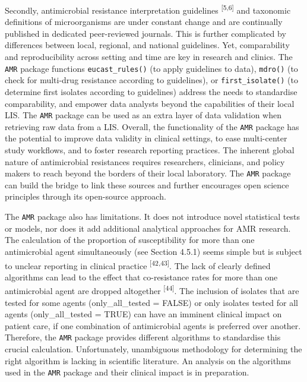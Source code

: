 \documentclass[
]{book}
\begin{document}
Secondly, antimicrobial resistance interpretation guidelines \textsuperscript{{[}5,6{]}} and taxonomic definitions of microorganisms are under constant change and are continually published in dedicated peer-reviewed journals. This is further complicated by differences between local, regional, and national guidelines. Yet, comparability and reproducibility across setting and time are key in research and clinics. The \texttt{AMR} package functions \texttt{eucast\_rules()} (to apply guidelines to data), \texttt{mdro()} (to check for multi-drug resistance according to guidelines), or \texttt{first\_isolate()} (to determine first isolates according to guidelines) address the needs to standardise comparability, and empower data analysts beyond the capabilities of their local LIS. The \texttt{AMR} package can be used as an extra layer of data validation when retrieving raw data from a LIS. Overall, the functionality of the \texttt{AMR} package has the potential to improve data validity in clinical settings, to ease multi-center study workflows, and to foster research reporting practices. The inherent global nature of antimicrobial resistances requires researchers, clinicians, and policy makers to reach beyond the borders of their local laboratory. The \texttt{AMR} package can build the bridge to link these sources and further encourages open science principles through its open-source approach.

The \texttt{AMR} package also has limitations. It does not introduce novel statistical tests or models, nor does it add additional analytical approaches for AMR research. The calculation of the proportion of susceptibility for more than one antimicrobial agent simultaneously (see Section 4.5.1) seems simple but is subject to unclear reporting in clinical practice \textsuperscript{{[}42,43{]}}. The lack of clearly defined algorithms can lead to the effect that co-resistance rates for more than one antimicrobial agent are dropped altogether \textsuperscript{{[}44{]}}. The inclusion of isolates that are tested for some agents (only\_all\_tested = FALSE) or only isolates tested for all agents (only\_all\_tested = TRUE) can have an imminent clinical impact on patient care, if one combination of antimicrobial agents is preferred over another. Therefore, the \texttt{AMR} package provides different algorithms to standardise this crucial calculation. Unfortunately, unambiguous methodology for determining the right algorithm is lacking in scientific literature. An analysis on the algorithms used in the \texttt{AMR} package and their clinical impact is in preparation.
\end{document}
